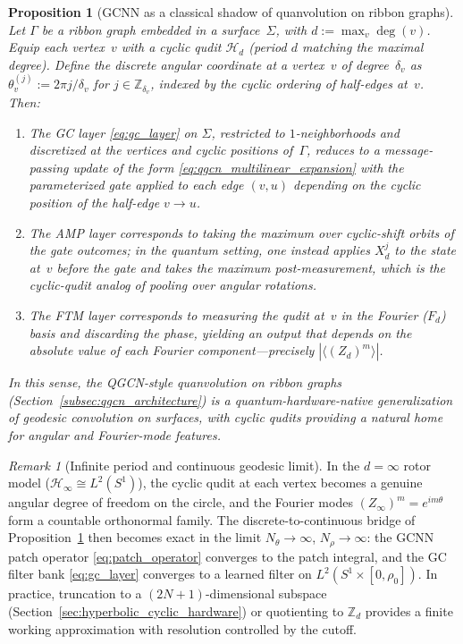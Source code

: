 \documentclass[11pt,oneside]{amsbook}
\numberwithin{equation}{section}
\theoremstyle{plain}
\newtheorem{proposition}[theorem]{Proposition}
\theoremstyle{definition}
\theoremstyle{remark}
\newtheorem{remark}[theorem]{Remark}
\begin{document}
\begin{proposition}[GCNN as a classical shadow of quanvolution on ribbon graphs]
\label{prop:gcnn_ribbon}
Let $\Gamma$ be a ribbon graph embedded in a surface~$\Sigma$, with $d:=\max_{v}\deg(v)$.
Equip each vertex~$v$ with a cyclic qudit $\mathcal{H}_d$ (period $d$ matching the maximal degree).
Define the \emph{discrete angular coordinate} at a vertex~$v$ of degree~$\delta_v$ as
$\theta_v^{(j)}:= 2\pi j/\delta_v$ for $j\in\mathbb{Z}_{\delta_v}$,
indexed by the cyclic ordering of half-edges at~$v$.
Then:
\begin{enumerate}
\item The GC layer \eqref{eq:gc_layer} on $\Sigma$, restricted to $1$-neighborhoods and discretized at the vertices and cyclic positions of~$\Gamma$, reduces to a message-passing update of the form \eqref{eq:qgcn_multilinear_expansion} with the parameterized gate applied to each edge $(v,u)$ depending on the cyclic position of the half-edge $v\to u$.
\item The AMP layer corresponds to taking the maximum over cyclic-shift orbits of the gate outcomes; in the quantum setting, one instead applies $X_d^j$ to the state at~$v$ before the gate and takes the maximum post-measurement, which is the cyclic-qudit analog of pooling over angular rotations.
\item The FTM layer corresponds to measuring the qudit at~$v$ in the Fourier ($F_d$) basis and discarding the phase, yielding an output that depends on the absolute value of each Fourier component---precisely $|\langle (Z_d)^m\rangle|$.
\end{enumerate}
In this sense, the QGCN-style quanvolution on ribbon graphs (Section~\ref{subsec:qgcn_architecture}) is a quantum-hardware-native generalization of geodesic convolution on surfaces, with cyclic qudits providing a natural home for angular and Fourier-mode features.
\end{proposition}

\begin{remark}[Infinite period and continuous geodesic limit]
In the $d=\infty$ rotor model ($\mathcal{H}_\infty \cong L^2(S^1)$), the cyclic qudit at each vertex becomes a genuine angular degree of freedom on the circle, and the Fourier modes $(Z_\infty)^m = e^{im\theta}$ form a countable orthonormal family.
The discrete-to-continuous bridge of Proposition~\ref{prop:gcnn_ribbon} then becomes exact in the limit $N_\theta\to\infty$, $N_\rho\to\infty$: the GCNN patch operator \eqref{eq:patch_operator} converges to the patch integral, and the GC filter bank \eqref{eq:gc_layer} converges to a learned filter on $L^2(S^1\times[0,\rho_0])$.
In practice, truncation to a $(2N+1)$-dimensional subspace (Section~\ref{sec:hyperbolic_cyclic_hardware}) or quotienting to $\mathbb{Z}_d$ provides a finite working approximation with resolution controlled by the cutoff.
\end{remark}
\end{document}
